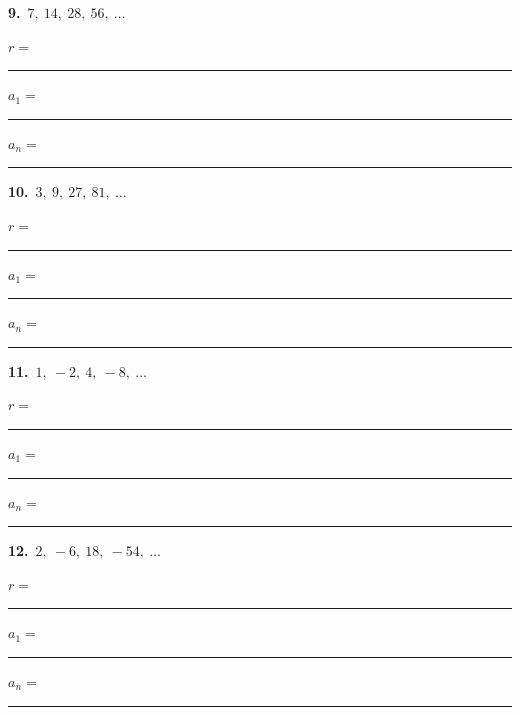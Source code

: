 \documentclass[11pt,letterpaper]{article}
\begin{document}
\needspace{2.3cm}\par\vspace{3mm}\noindent\begin{minipage}[t]{0.48\linewidth}{\color{fmturn}\bfseries 9.}\ $7,\ 14,\ 28,\ 56,\ \ldots$\par\vspace{2mm}\hspace*{4mm}$r=$\,\rule{1.2cm}{0.4pt}\par\vspace{2.5mm}\hspace*{4mm}$a_1=$\,\rule{1.4cm}{0.4pt}\quad $a_n=$\,\rule{2.6cm}{0.4pt}\end{minipage}\hfill\begin{minipage}[t]{0.48\linewidth}{\color{fmturn}\bfseries 10.}\ $3,\ 9,\ 27,\ 81,\ \ldots$\par\vspace{2mm}\hspace*{4mm}$r=$\,\rule{1.2cm}{0.4pt}\par\vspace{2.5mm}\hspace*{4mm}$a_1=$\,\rule{1.4cm}{0.4pt}\quad $a_n=$\,\rule{2.6cm}{0.4pt}\end{minipage}\par\vspace{1.3cm}
\needspace{2.3cm}\par\vspace{3mm}\noindent\begin{minipage}[t]{0.48\linewidth}{\color{fmturn}\bfseries 11.}\ $1,\ -2,\ 4,\ -8,\ \ldots$\par\vspace{2mm}\hspace*{4mm}$r=$\,\rule{1.2cm}{0.4pt}\par\vspace{2.5mm}\hspace*{4mm}$a_1=$\,\rule{1.4cm}{0.4pt}\quad $a_n=$\,\rule{2.6cm}{0.4pt}\end{minipage}\hfill\begin{minipage}[t]{0.48\linewidth}{\color{fmturn}\bfseries 12.}\ $2,\ -6,\ 18,\ -54,\ \ldots$\par\vspace{2mm}\hspace*{4mm}$r=$\,\rule{1.2cm}{0.4pt}\par\vspace{2.5mm}\hspace*{4mm}$a_1=$\,\rule{1.4cm}{0.4pt}\quad $a_n=$\,\rule{2.6cm}{0.4pt}\end{minipage}\par\vspace{1.3cm}
\end{document}

